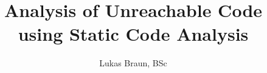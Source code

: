 \documentclass[master,english,smartquotes]{hgbthesis}
\title{Analysis of Unreachable Code using Static Code Analysis}
\author{Lukas Braun, BSc}
\begin{document}

\frontmatter                    %

\tableofcontents




\mainmatter          %


% 







\appendix                                            %


\MakeBibliography %

\end{document}
